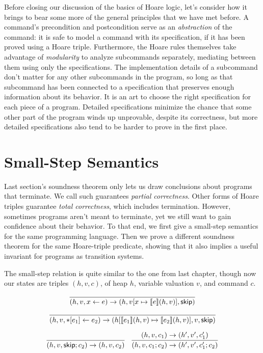 \documentclass{amsbook}
\theoremstyle{definition}
\theoremstyle{remark}
\numberwithin{section}{chapter}
\numberwithin{equation}{chapter}
\begin{document}
Before closing our discussion of the basics of Hoare logic, let's consider how it brings to bear some more of the general principles that we have met before.
\abstraction
A command's precondition and postcondition serve as an \emph{abstraction} of the command: it is safe to model a command with its specification, if it has been proved using a Hoare triple.
\modularity
Furthermore, the Hoare rules themselves take advantage of \emph{modularity} to analyze subcommands separately, mediating between them using only the specifications.
The implementation details of a subcommand don't matter for any other subcommands in the program, so long as that subcommand has been connected to a specification that preserves enough information about its behavior.
It is an art to choose the right specification for each piece of a program.
Detailed specifications minimize the chance that some other part of the program winds up unprovable, despite its correctness, but more detailed specifications also tend to be harder to prove in the first place.


\section{Small-Step Semantics}

Last section's soundness theorem only lets us draw conclusions about programs that terminate.
We call such guarantees \emph{partial correctness}.
Other forms of Hoare triples guarantee \emph{total correctness}, which includes termination.
However, sometimes programs aren't meant to terminate, yet we still want to gain confidence about their behavior.
To that end, we first give a small-step semantics for the same programming language.
Then we prove a different soundness theorem for the same Hoare-triple predicate, showing that it also implies a useful invariant for programs as transition systems.

The small-step relation is quite similar to the one from last chapter, though now our states are triples $(h, v, c)$, of heap $h$, variable valuation $v$, and command $c$.

\encoding
$$\infer{\smallstep{(h, v, \assign{x}{e})}{(h, \mupd{v}{x}{\denote{e}(h, v)}, \skipe)}}{}$$

$$\infer{\smallstep{(h, v, \writeto{e_1}{e_2})}{(\mupd{h}{\denote{e_1}(h, v)}{\denote{e_2}(h, v)}, v, \skipe)}}{}$$

$$\infer{\smallstep{(h, v, \skipe; c_2)}{(h, v, c_2)}}{}
\quad \infer{\smallstep{(h, v, c_1; c_2)}{(h', v', c'_1; c_2)}}{
  \smallstep{(h, v, c_1)}{(h', v', c'_1)}
}$$
\end{document}
